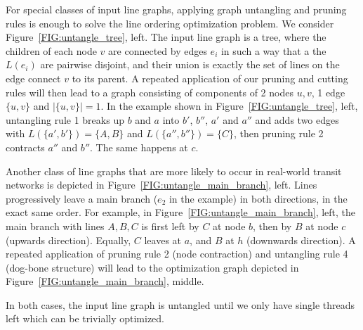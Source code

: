 \documentclass[format=acmsmall, review=false, screen=true]{acmart}
\begin{document}
For special classes of input line graphs, applying graph untangling and pruning rules is enough to solve the line ordering optimization problem.
We consider Figure~\ref{FIG:untangle_tree}, left.
The input line graph is a tree, where the children of each node $v$ are connected by edges $e_i$ in such a way that a the $L(e_i)$ are pairwise disjoint, and their union is exactly the set of lines on the edge connect $v$ to its parent.
A repeated application of our pruning and cutting rules will then lead to a graph consisting of components of 2 nodes $u, v$, 1 edge $\{u, v\}$ and $|\{u, v\}| = 1$.
In the example shown in Figure~\ref{FIG:untangle_tree}, left, untangling rule 1 breaks up $b$ and $a$ into $b'$, $b''$, $a'$ and $a''$ and adds two edges with $L(\{a', b'\})=\{A, B\}$ and $L(\{a'', b''\}) = \{C\}$, then pruning rule 2 contracts $a''$ and $b''$.
The same happens at $c$.

Another class of line graphs that are more likely to occur in real-world transit networks is depicted in Figure~\ref{FIG:untangle_main_branch}, left.
Lines progressively leave a main branch ($e_2$ in the example) in both directions, in the exact same order.
For example, in Figure~\ref{FIG:untangle_main_branch}, left, the main branch with lines $A, B, C$ is first left by $C$ at node $b$, then by $B$ at node $c$ (upwards direction). Equally, $C$ leaves at $a$, and $B$ at $h$ (downwards direction).
A repeated application of pruning rule 2 (node contraction) and untangling rule 4 (dog-bone structure) will lead to the optimization graph depicted in Figure~\ref{FIG:untangle_main_branch}, middle. 

In both cases, the input line graph is untangled until we only have single threads left which can be trivially optimized.
\end{document}
